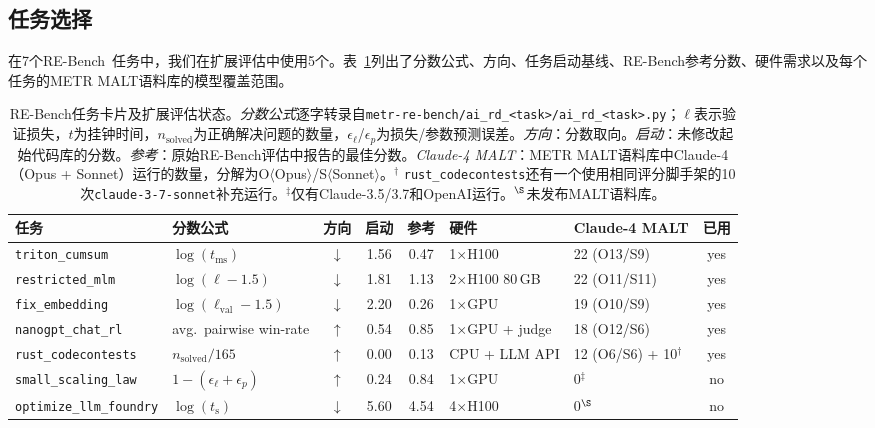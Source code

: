 \subsection{任务选择}
\label{sec-extension-tasks}

在7个RE-Bench~\citep{wijk2025rebench}任务中，我们在扩展评估中使用5个。表~\ref{tbl-extension-task-card}列出了分数公式、方向、任务启动基线、RE-Bench参考分数、硬件需求以及每个任务的METR MALT语料库的模型覆盖范围。

\begin{table}[h]
\centering
\small
\setlength{\tabcolsep}{4pt}
\begin{tabular}{l l c c c l l c}
\toprule
\textbf{任务} & \textbf{分数公式} & \textbf{方向} & \textbf{启动} & \textbf{参考} & \textbf{硬件} & \textbf{Claude-4 MALT} & \textbf{已用} \\
\midrule
\texttt{triton\_cumsum}         & $\log(t_\text{ms})$                & $\downarrow$ & 1.56 & 0.47 & 1$\times$H100        & 22 (O13/S9)        & yes \\
\texttt{restricted\_mlm}        & $\log(\ell{-}1.5)$                 & $\downarrow$ & 1.81 & 1.13 & 2$\times$H100 80\,GB & 22 (O11/S11)       & yes \\
\texttt{fix\_embedding}         & $\log(\ell_\text{val}{-}1.5)$      & $\downarrow$ & 2.20 & 0.26 & 1$\times$GPU         & 19 (O10/S9)        & yes \\
\texttt{nanogpt\_chat\_rl}      & avg.\ pairwise win-rate            & $\uparrow$   & 0.54 & 0.85 & 1$\times$GPU + judge & 18 (O12/S6)        & yes \\
\texttt{rust\_codecontests}     & $n_\text{solved}/165$              & $\uparrow$   & 0.00 & 0.13 & CPU + LLM API        & 12 (O6/S6) + 10$^\dagger$ & yes \\
\midrule
\texttt{small\_scaling\_law}    & $1{-}(\epsilon_\ell{+}\epsilon_p)$ & $\uparrow$   & 0.24 & 0.84 & 1$\times$GPU         & 0$^\ddagger$       & no \\
\texttt{optimize\_llm\_foundry} & $\log(t_\text{s})$                 & $\downarrow$ & 5.60 & 4.54 & 4$\times$H100        & 0$^\S$             & no \\
\bottomrule
\end{tabular}
\caption{RE-Bench任务卡片及扩展评估状态。\emph{分数公式}逐字转录自\texttt{metr-re-bench/ai\_rd\_<task>/ai\_rd\_<task>.py}；$\ell$表示验证损失，$t$为挂钟时间，$n_\text{solved}$为正确解决问题的数量，$\epsilon_\ell$/$\epsilon_p$为损失/参数预测误差。\emph{方向}：分数取向。\emph{启动}：未修改起始代码库的分数。\emph{参考}：原始RE-Bench评估中报告的最佳分数。\emph{Claude-4 MALT}：METR MALT语料库中Claude-4（Opus + Sonnet）运行的数量，分解为O$\langle$Opus$\rangle$/S$\langle$Sonnet$\rangle$。$^\dagger$ \texttt{rust\_codecontests}还有一个使用相同评分脚手架的10次\texttt{claude-3-7-sonnet}补充运行。$^\ddagger$仅有Claude-3.5/3.7和OpenAI运行。$^\S$未发布MALT语料库。}
\label{tbl-extension-task-card}
\end{table}

